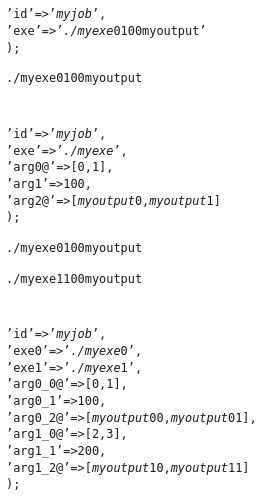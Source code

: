 \documentclass[a4paper,10pt]{report}
\begin{document}
\section{}

\begin{boxnote}
\begin{alltt}
%myjob = (
    'id' => '\textit{myjob}',
    'exe' => '\textit{./myexe} 0 100 myoutput'
);
\end{alltt}
\end{boxnote}

\begin{boxnote}
\begin{alltt}
./myexe 0 100 myoutput
\end{alltt}
\end{boxnote}

\section{}

\begin{boxnote}
\begin{alltt}
%myjob = (
    'id' => '\textit{myjob}',
    'exe' => '\textit{./myexe}',
    'arg0@' => [0,1],
    'arg1' => 100,
    'arg2@' => [\textit{myoutput}0,\textit{myoutput}1]
);
\end{alltt}
\end{boxnote}

\begin{boxnote}
\begin{alltt}
./myexe 0 100 myoutput
\end{alltt}
\end{boxnote}

\begin{boxnote}
\begin{alltt}
./myexe 1 100 myoutput
\end{alltt}
\end{boxnote}

\section{}

\begin{boxnote}
\begin{alltt}
%myjob = (
    'id' => '\textit{myjob}',
    'exe0' => '\textit{./myexe}0',
    'exe1' => '\textit{./myexe}1',
    'arg0_0@' => [0,1],
    'arg0_1' => 100,
    'arg0_2@' => [\textit{myoutput}00,\textit{myoutput}01],
    'arg1_0@' => [2,3],
    'arg1_1' => 200,
    'arg1_2@' => [\textit{myoutput}10,\textit{myoutput}11]
);
\end{alltt}
\end{boxnote}
\end{document}
